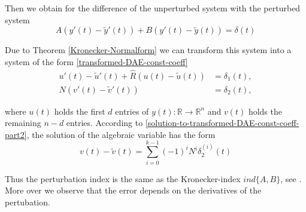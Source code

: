 Then we obtain for the difference of the unperturbed system with the perturbed system 
\begin{displaymath}
	A(y'(t)-\tilde{y}'(t)) + B(y'(t)-\tilde{y}(t)) = \delta(t)
\end{displaymath}

Due to Theorem \ref{Kronecker-Normalform} we can transform this system into a system of the form \eqref{transformed-DAE-const-coeff} %
\begin{align*}
	u'(t) - \tilde{u}'(t) + \hat{R} (u(t) - \tilde{u}(t) ) &= \delta_1(t), \\
	N(v'(t) - \tilde{v}'(t)) &= \delta_2(t),
\end{align*}

where $u(t)$ holds the first $d$ entries of $y(t):\mathbb{R} \to \mathbb{R}^n$ and $v(t)$ holds the remaining $n-d$ entries. According to \eqref{solution-to-transformed-DAE-const-coeff-part2}, the solution of the algebraic variable has the form
\begin{displaymath}
	v(t) - \tilde{v}(t) = \sum_{i=0}^{k-1} (-1)^iN^i \delta_2^{(i)}(t) 
\end{displaymath}

Thus the perturbation index is the same as the Kronecker-index $ind\{A,B\}$, see \cite{NumerikGewöhnlicherDifferentialgleichungen}. More over we observe that the error depends on the derivatives of the pertubation.


